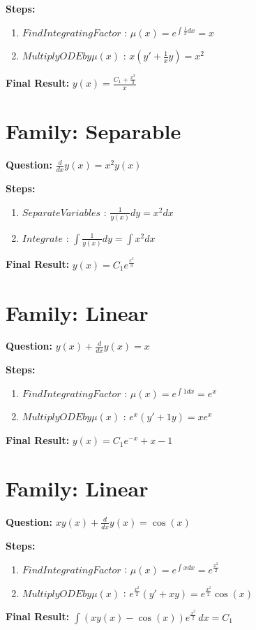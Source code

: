 \documentclass{article}
\begin{document}
\textbf{Steps:}
\begin{enumerate}
\item $Find Integrating Factor$ :  $\mu(x) = e^{\int \frac{1}{x} dx} = x$
\item $Multiply ODE by \mu(x)$ :  $x(y' + \frac{1}{x}y) = x^{2}$
\end{enumerate}
\textbf{Final Result:} $y{\left(x \right)} = \frac{C_{1} + \frac{x^{3}}{3}}{x}$

\section*{Family: Separable}
\textbf{Question:} $\frac{d}{d x} y{\left(x \right)} = x^{2} y{\left(x \right)}$

\textbf{Steps:}
\begin{enumerate}
\item $Separate Variables$ :  $\frac{1}{y{\left(x \right)}} dy = x^{2} dx$
\item $Integrate$ :  $\int \frac{1}{y{\left(x \right)}} dy = \int x^{2} dx$
\end{enumerate}
\textbf{Final Result:} $y{\left(x \right)} = C_{1} e^{\frac{x^{3}}{3}}$

\section*{Family: Linear}
\textbf{Question:} $y{\left(x \right)} + \frac{d}{d x} y{\left(x \right)} = x$

\textbf{Steps:}
\begin{enumerate}
\item $Find Integrating Factor$ :  $\mu(x) = e^{\int 1 dx} = e^{x}$
\item $Multiply ODE by \mu(x)$ :  $e^{x}(y' + 1y) = x e^{x}$
\end{enumerate}
\textbf{Final Result:} $y{\left(x \right)} = C_{1} e^{- x} + x - 1$

\section*{Family: Linear}
\textbf{Question:} $x y{\left(x \right)} + \frac{d}{d x} y{\left(x \right)} = \cos{\left(x \right)}$

\textbf{Steps:}
\begin{enumerate}
\item $Find Integrating Factor$ :  $\mu(x) = e^{\int x dx} = e^{\frac{x^{2}}{2}}$
\item $Multiply ODE by \mu(x)$ :  $e^{\frac{x^{2}}{2}}(y' + xy) = e^{\frac{x^{2}}{2}} \cos{\left(x \right)}$
\end{enumerate}
\textbf{Final Result:} $\int \left(x y{\left(x \right)} - \cos{\left(x \right)}\right) e^{\frac{x^{2}}{2}}\, dx = C_{1}$
\end{document}
